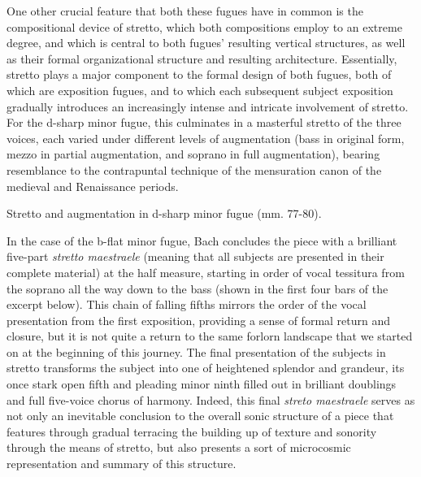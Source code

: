     One other crucial feature that both these fugues have in common is the
compositional device of stretto, which both compositions employ to an
extreme degree, and which is central to both fugues' resulting vertical
structures, as well as their formal organizational structure and
resulting architecture. Essentially, stretto plays a major component to
the formal design of both fugues, both of which are exposition fugues,
and to which each subsequent subject exposition gradually introduces an
increasingly intense and intricate involvement of stretto. For the
d-sharp minor fugue, this culminates in a masterful stretto of the three
voices, each varied under different levels of augmentation (bass in
original form, mezzo in partial augmentation, and soprano in full
augmentation), bearing resemblance to the contrapuntal technique of the
mensuration canon of the medieval and Renaissance periods.



\begin{Example}[H]
    \begin{center}
    \caption{ Stretto and augmentation in d-sharp minor fugue (mm. 77-80). }
    \end{center}
\end{Example}
    
    In the case of the b-flat minor fugue, Bach concludes the piece with a
brilliant five-part \emph{stretto maestraele} (meaning that all subjects
are presented in their complete material) at the half measure, starting
in order of vocal tessitura from the soprano all the way down to the
bass (shown in the first four bars of the excerpt below). This chain of
falling fifths mirrors the order of the vocal presentation from the
first exposition, providing a sense of formal return and closure, but it
is not quite a return to the same forlorn landscape that we started on
at the beginning of this journey. The final presentation of the subjects
in stretto transforms the subject into one of heightened splendor and
grandeur, its once stark open fifth and pleading minor ninth filled out
in brilliant doublings and full five-voice chorus of harmony. Indeed,
this final \emph{streto maestraele} serves as not only an inevitable
conclusion to the overall sonic structure of a piece that features
through gradual terracing the building up of texture and sonority
through the means of stretto, but also presents a sort of microcosmic
representation and summary of this structure.

